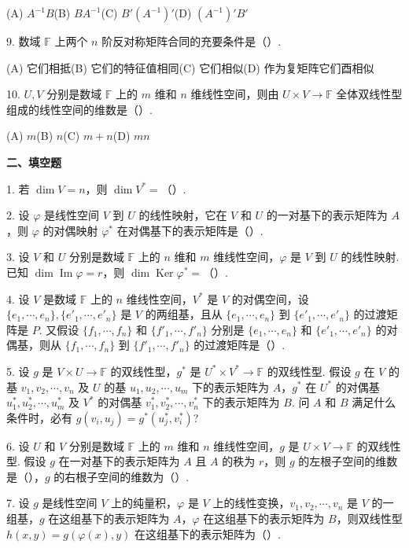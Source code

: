 \documentclass[UTF8, 12pt, fontset=fandol, oneside]{ctexart}
\begin{document}
(A) $A^{-1}B$\quad (B) $BA^{-1}$\quad (C) $B'(A^{-1})'$\quad (D) $(A^{-1})'B'$

9. 数域 $\mathbb{F}$ 上两个 $n$ 阶反对称矩阵合同的充要条件是（\quad ）.

(A) 它们相抵\quad (B) 它们的特征值相同\quad (C) 它们相似\quad (D) 作为复矩阵它们酉相似

10. $U,V$ 分别是数域 $\mathbb{F}$ 上的 $m$ 维和 $n$ 维线性空间，则由 $U\times V\to\mathbb{F}$ 全体双线性型组成的线性空间的维数是（\quad ）.

(A) $m$\quad (B) $n$\quad (C) $m+n$\quad (D) $mn$

\noindent\textbf{二、填空题}

1. 若 $\dim V=n$，则 $\dim V^*=$（\quad ）.

2. 设 $\varphi$ 是线性空间 $V$ 到 $U$ 的线性映射，它在 $V$ 和 $U$ 的一对基下的表示矩阵为 $A$，则 $\varphi$ 的对偶映射 $\varphi^*$ 在对偶基下的表示矩阵是（\quad ）.

3. 设 $V$ 和 $U$ 分别是数域 $\mathbb{F}$ 上的 $n$ 维和 $m$ 维线性空间，$\varphi$ 是 $V$ 到 $U$ 的线性映射. 已知 $\dim\operatorname{Im}\varphi=r$，则 $\dim\operatorname{Ker}\varphi^*=$（\quad ）.

4. 设 $V$ 是数域 $\mathbb{F}$ 上的 $n$ 维线性空间，$V^*$ 是 $V$ 的对偶空间，设 $\{e_1,\cdots,e_n\},\{e'_1,\cdots,e'_n\}$ 是 $V$ 的两组基，且从 $\{e_1,\cdots,e_n\}$ 到 $\{e'_1,\cdots,e'_n\}$ 的过渡矩阵是 $P$. 又假设 $\{f_1,\cdots,f_n\}$ 和 $\{f'_1,\cdots,f'_n\}$ 分别是 $\{e_1,\cdots,e_n\}$ 和 $\{e'_1,\cdots,e'_n\}$ 的对偶基，则从 $\{f_1,\cdots,f_n\}$ 到 $\{f'_1,\cdots,f'_n\}$ 的过渡矩阵是（\quad ）.

5. 设 $g$ 是 $V\times U\to\mathbb{F}$ 的双线性型，$g^*$ 是 $U^*\times V^*\to\mathbb{F}$ 的双线性型. 假设 $g$ 在 $V$ 的基 $v_1,v_2,\cdots,v_n$ 及 $U$ 的基 $u_1,u_2,\cdots,u_m$ 下的表示矩阵为 $A$，$g^*$ 在 $U^*$ 的对偶基 $u_1^*,u_2^*,\cdots,u_m^*$ 及 $V^*$ 的对偶基 $v_1^*,v_2^*,\cdots,v_n^*$ 下的表示矩阵为 $B$. 问 $A$ 和 $B$ 满足什么条件时，必有 $g(v_i,u_j)=g^*(u_j^*,v_i^*)$?

6. 设 $U$ 和 $V$ 分别是数域 $\mathbb{F}$ 上的 $m$ 维和 $n$ 维线性空间，$g$ 是 $U\times V\to\mathbb{F}$ 的双线性型. 假设 $g$ 在一对基下的表示矩阵为 $A$ 且 $A$ 的秩为 $r$，则 $g$ 的左根子空间的维数是（\quad ），$g$ 的右根子空间的维数为（\quad ）.

7. 设 $g$ 是线性空间 $V$ 上的纯量积，$\varphi$ 是 $V$ 上的线性变换，$v_1,v_2,\cdots,v_n$ 是 $V$ 的一组基，$g$ 在这组基下的表示矩阵为 $A$，$\varphi$ 在这组基下的表示矩阵为 $B$，则双线性型 $h(x,y)=g(\varphi(x),y)$ 在这组基下的表示矩阵为（\quad ）.
\end{document}

